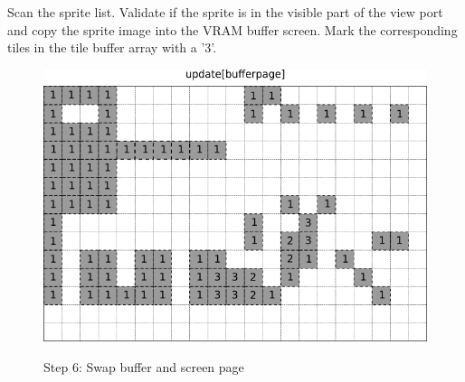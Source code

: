 \documentclass[book.tex]{subfiles}
\begin{document}
\begin{minipage}{.4\textwidth}
Scan the sprite list. Validate if the sprite is in the visible part of the view port and copy the sprite image into the VRAM buffer screen. Mark the corresponding tiles in the  tile buffer array with a '3'.
 \end{minipage}
\begin{minipage}{.6\textwidth}
\begin{figure}[H]
  \centering
 \includegraphics[width=.9\textwidth]{screenshots_300dpi/game/Scroll_KC1-3_1-update_sprite.png}
 \label{fig:kc1_3_update_sprite_img_1}  
\end{figure}
\end{minipage}

\pagebreak

\begin{figure}[H]
\centering
 \caption{Step 6: Swap buffer and screen page}
 \label{fig:kc1_3_update_final}
\end{figure}
\end{document}
